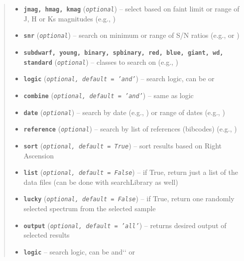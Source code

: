 \documentclass[letterpaper,10pt,english]{sphinxmanual}
\begin{document}
\begin{fulllineitems}
\begin{quote}
\begin{description}
\begin{itemize}
\item {} 
\textbf{\texttt{jmag, hmag, kmag}} (\emph{\texttt{optional}}) -- select based on faint limit or range of J, H or Ks magnitudes (e.g., )

\item {} 
\textbf{\texttt{snr}} (\emph{\texttt{optional}}) -- search on minimum or range of S/N ratios (e.g.,  or )

\item {} 
\textbf{\texttt{subdwarf, young, binary, spbinary, red, blue, giant, wd, standard}} (\emph{\texttt{optional}}) -- classes to search on (e.g., )

\item {} 
\textbf{\texttt{logic}} (\emph{\texttt{optional, default = 'and'}}) -- search logic, can be  or 

\item {} 
\textbf{\texttt{combine}} (\emph{\texttt{optional, default = 'and'}}) -- same as logic

\item {} 
\textbf{\texttt{date}} (\emph{\texttt{optional}}) -- search by date (e.g., ) or range of dates (e.g., )

\item {} 
\textbf{\texttt{reference}} (\emph{\texttt{optional}}) -- search by list of references (bibcodes) (e.g., )

\item {} 
\textbf{\texttt{sort}} (\emph{\texttt{optional, default = True}}) -- sort results based on Right Ascension

\item {} 
\textbf{\texttt{list}} (\emph{\texttt{optional, default = False}}) -- if True, return just a list of the data files (can be done with searchLibrary as well)

\item {} 
\textbf{\texttt{lucky}} (\emph{\texttt{optional, default = False}}) -- if True, return one randomly selected spectrum from the selected sample

\item {} 
\textbf{\texttt{output}} (\emph{\texttt{optional, default = 'all'}}) -- returns desired output of selected results

\item {} 
\textbf{\texttt{logic}} -- search logic, can be and{}`{}` or 


\end{itemize}
\end{description}
\end{quote}
\end{fulllineitems}
\end{document}
